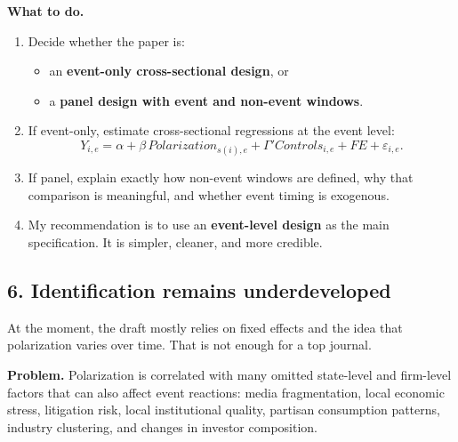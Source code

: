 \documentclass[12pt]{article}
\begin{document}
\textbf{What to do.}
\begin{enumerate}[leftmargin=2em]
    \item Decide whether the paper is:
    \begin{itemize}[leftmargin=2em]
        \item an \textbf{event-only cross-sectional design}, or
        \item a \textbf{panel design with event and non-event windows}.
    \end{itemize}
    \item If event-only, estimate cross-sectional regressions at the event level:
    \[
        Y_{i,e} = \alpha + \beta \, Polarization_{s(i),e} + \Gamma' Controls_{i,e} + FE + \varepsilon_{i,e}.
    \]
    \item If panel, explain exactly how non-event windows are defined, why that comparison is meaningful, and whether event timing is exogenous.
    \item My recommendation is to use an \textbf{event-level design} as the main specification. It is simpler, cleaner, and more credible.
\end{enumerate}

\subsection{6. Identification remains underdeveloped}
At the moment, the draft mostly relies on fixed effects and the idea that polarization varies over time. That is not enough for a top journal.

\textbf{Problem.} Polarization is correlated with many omitted state-level and firm-level factors that can also affect event reactions: media fragmentation, local economic stress, litigation risk, local institutional quality, partisan consumption patterns, industry clustering, and changes in investor composition.
\end{document}
